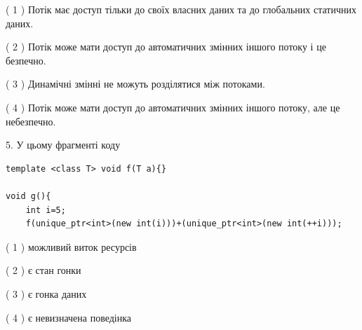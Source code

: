 \documentclass[12pt, ukrainian]{article}
\begin{document}
\begin {large}
{( 1 ) Потік має доступ тільки до своїх власних даних та до глобальних статичних даних.%

( 2 ) Потік може мати доступ до автоматичних змінних іншого потоку і це безпечно.%

( 3 ) Динамічні змінні не можуть розділятися між потоками.%

( 4 ) Потік може мати доступ до автоматичних змінних іншого потоку, але це небезпечно.%


5. У цьому фрагменті коду
\begin{verbatim}
template <class T> void f(T a){}

void g(){
    int i=5;
    f(unique_ptr<int>(new int(i)))+(unique_ptr<int>(new int(++i)));
\end{verbatim}
( 1 ) можливий виток ресурсів%

( 2 ) є стан гонки%

( 3 ) є гонка даних%

( 4 ) є невизначена поведінка%
}
\end {large}
\end{document}
